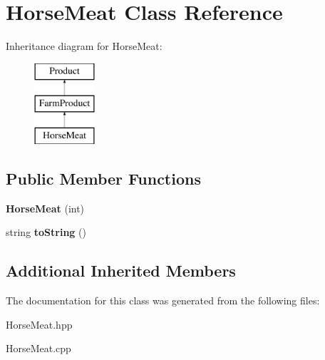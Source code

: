 \hypertarget{class_horse_meat}{}\section{Horse\+Meat Class Reference}
\label{class_horse_meat}
Inheritance diagram for Horse\+Meat\+:\begin{figure}[H]
\begin{center}
\leavevmode
\includegraphics[height=3.000000cm]{class_horse_meat}
\end{center}
\end{figure}
\subsection*{Public Member Functions}
\begin{DoxyCompactItemize}
\item 
\mbox{\label{class_horse_meat_a58b9dd2ba0277062e3f5873767ff6a89}} 
{\bfseries Horse\+Meat} (int)
\item 
\mbox{\label{class_horse_meat_afb689c5879f2c263e978c6593a804a36}} 
string {\bfseries to\+String} ()
\end{DoxyCompactItemize}
\subsection*{Additional Inherited Members}


The documentation for this class was generated from the following files\+:\begin{DoxyCompactItemize}
\item 
Horse\+Meat.\+hpp\item 
Horse\+Meat.\+cpp\end{DoxyCompactItemize}
